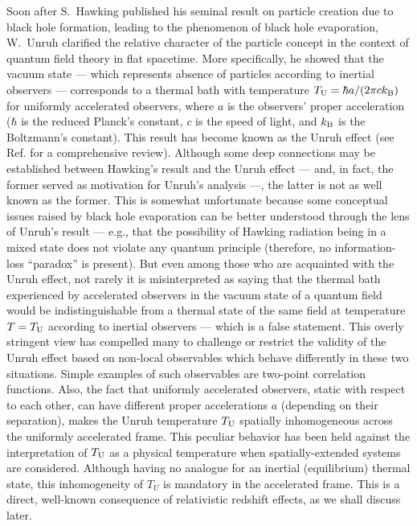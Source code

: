 \documentclass[]{nature}
\begin{document}
Soon after S.\ Hawking published his seminal result on particle creation due to black hole formation, 
leading to the
phenomenon of black hole evaporation\cite{Hawk}, W.~Unruh clarified the relative character of the  
 particle concept in the context of quantum field theory in flat spacetime.
More specifically, he showed that the vacuum state --- which 
represents absence of particles according to inertial observers --- corresponds to a thermal bath with temperature
$T_{\rm U} = \hbar a/(2 \pi c k_{\rm B})$ for uniformly accelerated observers\cite{Unruh}, 
where $a$ is the observers'   proper  acceleration
($\hbar$ is the reduced Planck's constant, $c$ is the speed of light, and $k_{\rm B}$ is the Boltzmann's constant).
This result has become known as the Unruh effect (see Ref.\cite{CHM} for a comprehensive
review). Although some deep connections may be established 
between Hawking's result
and the Unruh effect --- and, in fact, the former served as motivation for Unruh's analysis ---, the latter
is not as well known as the former. This is somewhat unfortunate because some conceptual issues
raised by black hole evaporation can be better understood through the lens of Unruh's result  
--- e.g.,  that the possibility of Hawking radiation being in a mixed state does  not violate any  quantum principle
(therefore, no information-loss ``paradox'' is present\cite{UW}). But even
among those who are acquainted with the Unruh effect, not rarely it is
misinterpreted as  saying that the thermal bath experienced by accelerated 
observers in the vacuum state of a quantum field would be  indistinguishable from a thermal state of the same field 
at  temperature $T = T_{\rm U}$ according to  inertial observers  --- which is a  false statement. This overly stringent
view has compelled many to challenge
or restrict the validity of the Unruh effect based on non-local observables
which behave differently in these two situations. Simple examples of such observables
are two-point correlation functions\cite{AS}. Also, the fact that uniformly accelerated observers,
static with respect to each other, can have different proper accelerations $a$ (depending on their separation), 
makes  the Unruh temperature $T_{\rm U}$ spatially inhomogeneous across the uniformly accelerated frame. This peculiar behavior
has been held against the interpretation of $T_{\rm U}$ 
as a physical temperature when spatially-extended  systems are considered\cite{BV}.
Although having no
analogue for an inertial (equilibrium) thermal 
state, this inhomogeneity of $T_U$  is mandatory in the accelerated frame. This is a direct, well-known consequence
of relativistic redshift effects\cite{Tolman}, as we shall discuss later.
\end{document}
